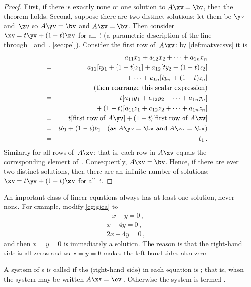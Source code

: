\begin{proof} 
First, if there is exactly none or one solution to \(A\xv=\bv\), then the theorem holds. 
Second, suppose there are two distinct solutions; let them be \(\yv\) and~\(\zv\) so \(A\yv=\bv\) and \(A\zv=\bv\).  
Then consider \(\xv=t\yv+(1-t)\zv\) for all~\(t\) (a parametric description of the line through~\yv\ and~\zv, \autoref{sec:pel}). 
Consider the first row of~\(A\xv\): by \autoref{def:matvecsys} it is
\begin{eqnarray*}&&
a_{11}x_1+a_{12}x_2+\cdots+a_{1n}x_n
\\&=&a_{11}[ty_1+(1-t)z_1]+a_{12}[ty_2+(1-t)z_2]
\\&&{}
+\cdots+a_{1n}[ty_n+(1-t)z_n]
\\&&\quad(\text{then rearrange this scalar expression})
\\&=&t[a_{11}y_1+a_{12}y_2+\cdots+a_{1n}y_n]
\\&&{}
+(1-t)[a_{11}z_1+a_{12}z_2+\cdots+a_{1n}z_n]
\\&=&t[\text{first row of }A\yv]
+(1-t)[\text{first row of }A\zv]
\\&=&tb_1+(1-t)b_1 \quad(\text{as }A\yv=\bv\text{ and }A\zv=\bv)
\\&=&b_1\,.
\end{eqnarray*}
Similarly for all rows of~\(A\xv\): that is, each row in \(A\xv\) equals the corresponding element of~\bv.
Consequently, \(A\xv=\bv\). 
Hence, if there are ever two distinct solutions, then there are an infinite number of solutions: \(\xv=t\yv+(1-t)\zv\) for all~\(t\).
\end{proof}




An important class of linear equations always has at least one solution, never none.
For example, modify \autoref{eg:gjea} to 
\begin{equation*}
\begin{array}{l}
-x-y=0\,,\\x+4y=0\,,\\2x+4y=0\,,
\end{array}
\end{equation*}
and then \(x=y=0\) is immediately a solution.  
The reason is that the right-hand side is all zeros and so \(x=y=0\) makes the left-hand sides also zero.

\begin{definition} \label{def:homosys} 
A system of s is called  if the (right-hand side)  in each equation is ; that is, when the system may be written \(A\xv=\ov\)\,.
Otherwise the system is termed .
\end{definition}

